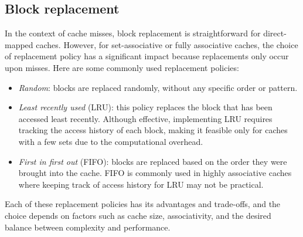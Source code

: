 \subsection{Block replacement}
In the context of cache misses, block replacement is straightforward for direct-mapped caches. 
However, for set-associative or fully associative caches, the choice of replacement policy has a significant impact because replacements only occur upon misses.
Here are some commonly used replacement policies:
\begin{itemize}
    \item \textit{Random}: blocks are replaced randomly, without any specific order or pattern.
    \item \textit{Least recently used} (LRU): this policy replaces the block that has been accessed least recently. 
        Although effective, implementing LRU requires tracking the access history of each block, making it feasible only for caches with a few sets due to the computational overhead.
    \item \textit{First in first out} (FIFO): blocks are replaced based on the order they were brought into the cache. 
        FIFO is commonly used in highly associative caches where keeping track of access history for LRU may not be practical.
\end{itemize}
Each of these replacement policies has its advantages and trade-offs, and the choice depends on factors such as cache size, associativity, and the desired balance between complexity and performance.

